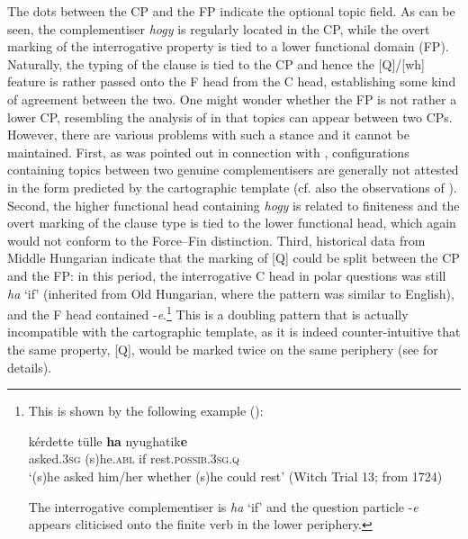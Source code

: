 The dots between the CP and the FP indicate the optional topic field. As can be seen, the complementiser \textit{hogy} is regularly located in the CP, while the overt marking of the interrogative property is tied to a lower functional domain (FP). Naturally, the typing of the clause is tied to the CP and hence the [Q]/[wh] feature is rather passed onto the F head from the C head, establishing some kind of agreement between the two. One might wonder whether the FP is not rather a lower CP, resembling the analysis of \citet{rizzi1997, rizzi2004} in that topics can appear between two CPs. However, there are various problems with such a stance and it cannot be maintained. First, as was pointed out in connection with \citet{rizzi1997, rizzi2004}, configurations containing topics between two genuine complementisers are generally not attested in the form predicted by the cartographic template (cf. also the observations of \citealt{beninca2001}). Second, the higher functional head containing \textit{hogy} is related to finiteness and the overt marking of the clause type is tied to the lower functional head, which again would not conform to the Force--Fin distinction. Third, historical data from Middle Hungarian indicate that the marking of [Q] could be split between the CP and the FP: in this period, the interrogative C head in polar questions was still \textit{ha} `if' (inherited from Old Hungarian, where the pattern was similar to English), and the F head contained -\textit{e}.\footnote{This is shown by the following example (\citealt[121, ex. 15a]{bacskaiatkari2022oup}):

\ea \gll kérdette tülle \textbf{ha} nyughatik\textbf{e}\\
asked.\textsc{3sg} (s)he.\textsc{abl} if rest.\textsc{possib.3sg.q}\\
\glt `(s)he asked him/her whether (s)he could rest' (Witch Trial 13; from 1724)
\z

The interrogative complementiser is \textit{ha} `if' and the question particle -\textit{e} appears cliticised onto the finite verb in the lower periphery.} This is a doubling pattern that is actually incompatible with the cartographic template, as it is indeed counter-intuitive that the same property, [Q], would be marked twice on the same periphery (see \citealt{bacskaiatkaridekany2014oup} for details). 

